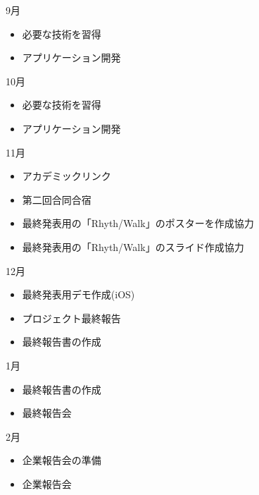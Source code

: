 9月 
\begin{itemize}
\item 必要な技術を習得
\item アプリケーション開発
\end{itemize}
10月
\begin{itemize}
\item 必要な技術を習得
\item アプリケーション開発
\end{itemize}
11月
\begin{itemize}
\item アカデミックリンク
\item 第二回合同合宿
\item 最終発表用の「Rhyth/Walk」のポスターを作成協力
\item 最終発表用の「Rhyth/Walk」のスライド作成協力
\end{itemize}
12月
\begin{itemize}
\item 最終発表用デモ作成(iOS)
\item プロジェクト最終報告
\item 最終報告書の作成
\end{itemize}
1月
\begin{itemize}
\item 最終報告書の作成
\item 最終報告会
\end{itemize}
2月
\begin{itemize}
\item 企業報告会の準備
\item 企業報告会
\end{itemize}

